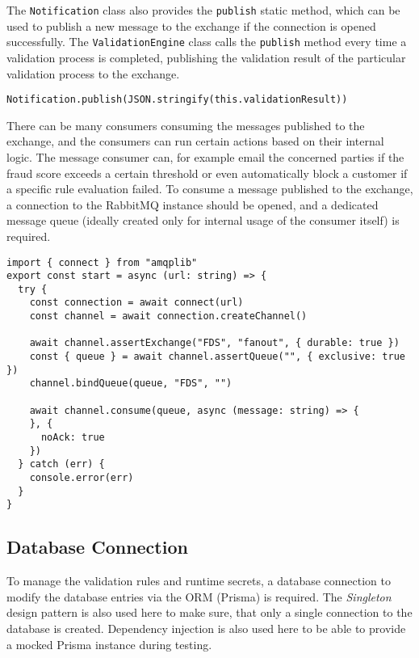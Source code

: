    The \verb;Notification; class also provides the \verb;publish; static method, which can be used to publish a new message to the exchange if the connection is opened successfully. The \verb;ValidationEngine; class calls the \verb;publish; method every time a validation process is completed, publishing the validation result of the particular validation process to the exchange.

    \begin{lstlisting}[style=es6, caption={Publishing a validation result to the RabbitMQ exchange (TypeScript)}]
Notification.publish(JSON.stringify(this.validationResult))
\end{lstlisting}
    
    There can be many consumers consuming the messages published to the exchange, and the consumers can run certain actions based on their internal logic. The message consumer can, for example email the concerned parties if the fraud score exceeds a certain threshold or even automatically block a customer if a specific rule evaluation failed. To consume a message published to the exchange, a connection to the RabbitMQ instance should be opened, and a dedicated message queue (ideally created only for internal usage of the consumer itself) is required. 

    \begin{lstlisting}[style=es6, caption={Consuming a message published to the RabbitMQ exchange (TypeScript)}]
import { connect } from "amqplib"
export const start = async (url: string) => {
  try {
    const connection = await connect(url)
    const channel = await connection.createChannel()

    await channel.assertExchange("FDS", "fanout", { durable: true })
    const { queue } = await channel.assertQueue("", { exclusive: true })
    channel.bindQueue(queue, "FDS", "") 

    await channel.consume(queue, async (message: string) => {
    }, {
      noAck: true
    })
  } catch (err) {
    console.error(err)
  }
}
\end{lstlisting}

  \subsection{Database Connection}
  
    To manage the validation rules and runtime secrets, a database connection to modify the database entries via the ORM (Prisma) is required. The \emph{Singleton} \autocite[pp. 127-134]{gamma-1995} design pattern is also used here to make sure, that only a single connection to the database is created. Dependency injection is also used here to be able to provide a mocked Prisma instance during testing. 

